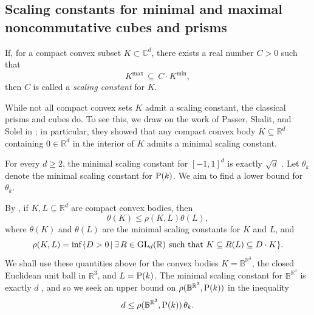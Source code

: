 \documentclass{amsart}
\theoremstyle{definition}
\theoremstyle{remark}
\numberwithin{equation}{section}
\begin{document}
\subsection{Scaling constants for minimal and maximal noncommutative cubes and prisms}
If, for a compact convex subset $K\subset\mathbb C^d$, there exists a
real number $C>0$ such that
\[
K^{\textrm{max}} \,\subseteq\,C\cdot K^{\textrm{min}},
\]
then $C$ is called a \emph{scaling constant} for $K$. 

While not all compact convex sets $K$ admit a scaling constant, the classical prisms and cubes do.
To see this, we draw
on the work of Passer, Shalit, and Solel in \cite{passer--shalit--solel2018}; in particular, they 
showed that any compact convex body $K\subseteq\mathbb R^d$ containing $0\in\mathbb R^d$ 
in the interior of $K$ admits a minimal scaling constant.

For every $d\geq 2$, the minimal scaling constant for $[-1,1]^d$ is exactly $\sqrt{d}$ \cite[p.~3233]{passer--shalit--solel2018}.
Let $\theta_k$ denote the minimal scaling constant for $\mbox{\textrm P}(k)$. We aim to find a lower bound for $\theta_k$.

By \cite[Proposition 3.4]{passer--shalit--solel2018}, if $K,L\subseteq\mathbb R^d$ are compact convex bodies, then
\[
\theta(K)\leq\rho(K,L)\theta(L),
\]
where $\theta(K)$ and $\theta(L)$ are the minimal scaling constants for $K$ and $L$, and 
\[
\rho(K,L)=\inf\{D>0\,|\, \exists\, R\in\mbox{\textrm GL}_d(\mathbb R)\mbox{ such that } K\subseteq R(L)\subseteq D\cdot K\}.
\]
We shall use these quantities above for the convex bodies 
$K=\mathbb B^{\mathbb R^3}$, the closed Euclidean unit ball in $\mathbb R^3$, and $L=\mbox{\textrm P}(k)$.
The minimal
scaling constant for $\mathbb B^{\mathbb R^3}$ is exactly $d$ \cite{passer--shalit--solel2018}, and so we seek an upper bound on
$\rho(\mathbb B^{\mathbb R^3},\mbox{\textrm P}(k))$ in the inequality
\[
d \leq \rho(\mathbb B^{\mathbb R^3},\mbox{\textrm P}(k))\,\theta_k.
\]
\end{document}
